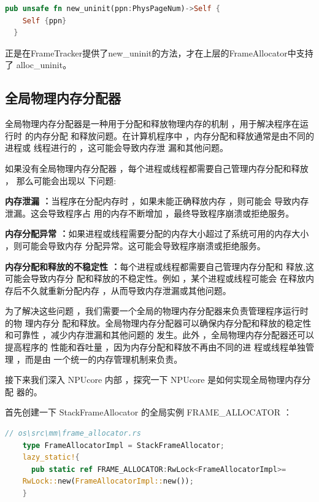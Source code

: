     \begin{lstlisting}[language=Rust]
 pub unsafe fn new_uninit(ppn:PhysPageNum)->Self {
    Self {ppn}
  }
    \end{lstlisting}

正是在FrameTracker提供了new\_uninit的方法，才在上层的FrameAllocator中支持了
alloc\_uninit。

	\subsection{全局物理内存分配器}
	
	全局物理内存分配器是一种用于分配和释放物理内存的机制 ，用于解决程序在运行时
	的内存分配 和释放问题。在计算机程序中 ，内存分配和释放通常是由不同的进程或
	线程进行的 ，这可能会导致内存泄 漏和其他问题。
	
	如果没有全局物理内存分配器 ，每个进程或线程都需要自己管理内存分配和释放 ，
	那么可能会出现以 下问题:
	
	\textbf{内存泄漏 ：}当程序在分配内存时 ，如果未能正确释放内存 ，则可能会
	导致内存泄漏。这会导致程序占 用的内存不断增加 ，最终导致程序崩溃或拒绝服务。
	
	\textbf{内存分配异常 ：}如果进程或线程需要分配的内存大小超过了系统可用的内存大小
	 ，则可能会导致内存 分配异常。这可能会导致程序崩溃或拒绝服务。
	
	\textbf{内存分配和释放的不稳定性 ：}每个进程或线程都需要自己管理内存分配和
	释放,这可能会导致内存分 配和释放的不稳定性。例如 ，某个进程或线程可能会
	在释放内存后不久就重新分配内存 ，从而导致内存泄漏或其他问题。
	
	为了解决这些问题 ，我们需要一个全局的物理内存分配器来负责管理程序运行时的物
	理内存分 配和释放。全局物理内存分配器可以确保内存分配和释放的稳定性和可靠性
	 ，减少内存泄漏和其他问题的 发生。此外 ，全局物理内存分配器还可以提高程序的
	 性能和吞吐量 ，因为内存分配和释放不再由不同的进 程或线程单独管理 ，而是由
	 一个统一的内存管理机制来负责。
	
	接下来我们深入 NPUcore 内部 ，探究一下 NPUcore 是如何实现全局物理内存分配
	器的。
	
	首先创建一下  StackFrameAllocator 的全局实例  FRAME\_ALLOCATOR  ：
\begin{lstlisting}[language=Rust]
  // os\src\mm\frame_allocator.rs
    type FrameAllocatorImpl = StackFrameAllocator;
    lazy_static!{
      pub static ref FRAME_ALLOCATOR:RwLock<FrameAllocatorImpl>=
    RwLock::new(FrameAllocatorImpl::new());
    }
\end{lstlisting}

